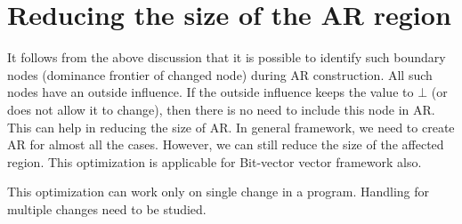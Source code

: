 \documentclass[11pt,a4paper,openright]{report}
\begin{document}
\section{Reducing the size of the AR region}
It follows from the above discussion that it is possible to identify such boundary nodes (dominance frontier of changed node) during AR construction.
All such nodes have an outside influence. If the outside influence keeps the value to $\bot$ (or does not allow it to change), 
then there is no need to include this node in AR. This can help in reducing the size of AR.
In general framework, we need to create AR for almost all the cases. However, we can still reduce the size of the affected region. This optimization is applicable
for Bit-vector vector framework also. 

This optimization can work only on single change in a program. Handling for multiple changes need to be studied. 
\end{document}
